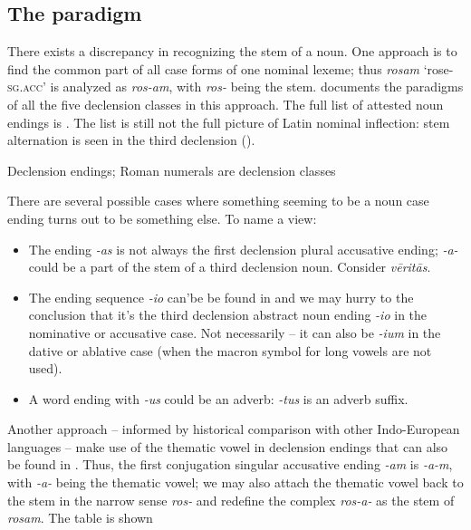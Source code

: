 \documentclass[a4paper, oneside, 12pt]{report}
\newcommand*{\citepage}[1]{p.~{#1}}
\newcommand*{\citepages}[1]{pp.~{#1}}
\newcommand{\form}[1]{\emph{#1}}
\newcommand*{\category}[1]{\textsc{#1}}
\newcommand{\translate}[1]{`#1'}
\begin{document}
\subsection{The paradigm}\label{sec:noun.paradigm.introduction}

There exists a discrepancy in recognizing the stem of a noun.
One approach is to find the common part 
of all case forms of one nominal lexeme;
thus \form{rosam} \translate{rose-\category{sg}.\category{acc}}
is analyzed as \form{ros-am}, 
with \form{ros-} being the stem.
\citet[\citepage{17}]{allen1903allen} documents the paradigms of all the five declension classes 
in this approach.
The full list of attested noun endings is .
The list is still not the full picture of Latin nominal inflection:
stem alternation is seen in the third declension
().

\begin{table}[H]
    \caption{Declension endings; Roman numerals are declension classes}
    \label{tbl:declension-ending-nouns-list}
    \centering
    
\end{table}

There are several possible cases where something seeming to be a noun case ending 
turns out to be something else.
To name a view:
\begin{itemize}
    \item The ending \form{-as} is not always the first declension plural accusative ending;
    \form{-a-} could be a part of the stem of a third declension noun.
    Consider \form{vēritās}.
    \item The ending sequence \form{-io} can'be be found in 
    and we may hurry to the conclusion 
    that it's the third declension abstract noun ending \form{-io} 
    in the nominative or accusative case.
    Not necessarily -- 
    it can also be \form{-ium} in the dative or ablative case 
    (when the macron symbol for long vowels are not used).
    \item A word ending with \form{-us} could be an adverb:  
        \form{-tus} is an adverb suffix.
\end{itemize}

Another approach -- informed by historical comparison with other Indo-European languages -- 
make use of the thematic vowel 
in declension endings that can also be found in
\citep[\citepages{45, 63}]{oniga2014latin}.
Thus, the first conjugation singular accusative ending \form{-am} 
is \form{-a-m}, 
with \form{-a-} being the thematic vowel;
we may also attach the thematic vowel back to the stem in the narrow sense \form{ros-} 
and redefine the complex \form{ros-a-} as the stem of \form{rosam}.
The table is shown 
\end{document}
